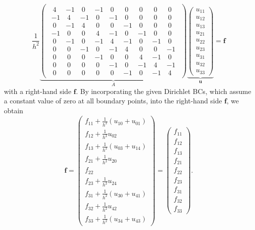 \begin{equation}
\frac{1}{h^2} \underbrace{ \begin{pmatrix}
\begin{array}{ccc|ccc|ccc}~4&-1&~0&-1&~0&~0&~0&~0&~0\\-1&~4&-1&~0&-1&~0&~0&~0&~0\\~0&-1&~4&~0&~0&-1&~0&~0&~0\\\hline -1&~0&~0&~4&-1&~0&-1&~0&~0\\~0&-1&~0&-1&~4&-1&~0&-1&~0\\~0&~0&-1&~0&-1&~4&~0&~0&-1\\\hline ~0&~0&~0&-1&~0&~0&~4&-1&~0\\~0&~0&~0&~0&-1&~0&-1&~4&-1\\~0&~0&~0&~0&~0&-1&~0&-1&~4\end{array}
	\end{pmatrix}}_{\textstyle A}
\underbrace{
	\begin{pmatrix}
	u_{11} \\ u_{12} \\ u_{13} \\ u_{21} \\ u_{22} \\ u_{23} \\ u_{31} \\ u_{32} \\ u_{33}
\end{pmatrix}}_{\textstyle{\bm{u}}} = \bm f
\label{eq:2D-poisson-assembled-matrix}
\end{equation}
with a right-hand side $\bm f$. 
By incorporating the given Dirichlet BCs, which assume a constant value of zero at all boundary points, into the right-hand side $\bm{f}$, we obtain
\begin{equation}
\bm f = \begin{pmatrix}
		f_{11} + \frac{1}{h^2} (u_{10} + u_{01}) \\f_{12} + \frac{1}{h^2} u_{02} \\ f_{13} + \frac{1}{h^2} (u_{03} + u_{14})  \\ f_{21} + \frac{1}{h^2} u_{20} \\ f_{22} \\ f_{23} + \frac{1}{h^2} u_{24} \\ f_{31} + \frac{1}{h^2} (u_{30} + u_{41}) \\ f_{32} + \frac{1}{h^2} u_{42} \\ f_{33} + \frac{1}{h^2} (u_{34} + u_{43})
\end{pmatrix} = \begin{pmatrix}
f_{11} \\
f_{12} \\ 
f_{13} \\ 
f_{21} \\ 
f_{22} \\
f_{23} \\
f_{31} \\ 
f_{32} \\
f_{33}
\end{pmatrix}.
\label{eq:2D-poisson-assembled-rhs}
\end{equation}
